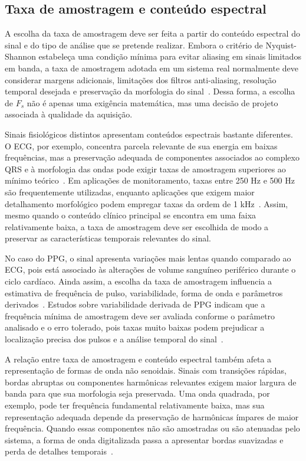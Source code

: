 \documentclass[a4paper,12pt]{fcte}
\begin{document}
\subsection{Taxa de amostragem e conteúdo espectral}

A escolha da taxa de amostragem deve ser feita a partir do conteúdo espectral do sinal e do tipo de análise que se pretende realizar. Embora o critério de Nyquist-Shannon estabeleça uma condição mínima para evitar aliasing em sinais limitados em banda, a taxa de amostragem adotada em um sistema real normalmente deve considerar margens adicionais, limitações dos filtros anti-aliasing, resolução temporal desejada e preservação da morfologia do sinal~\cite{kester2008mt002}. Dessa forma, a escolha de $F_s$ não é apenas uma exigência matemática, mas uma decisão de projeto associada à qualidade da aquisição.

Sinais fisiológicos distintos apresentam conteúdos espectrais bastante diferentes. O ECG, por exemplo, concentra parcela relevante de sua energia em baixas frequências, mas a preservação adequada de componentes associados ao complexo QRS e à morfologia das ondas pode exigir taxas de amostragem superiores ao mínimo teórico~\cite{chu2023ecgsystem,su2023ecg_acquisition}. Em aplicações de monitoramento, taxas entre 250 Hz e 500 Hz são frequentemente utilizadas, enquanto aplicações que exigem maior detalhamento morfológico podem empregar taxas da ordem de 1 kHz~\cite{raus2025ecg_testing}. Assim, mesmo quando o conteúdo clínico principal se encontra em uma faixa relativamente baixa, a taxa de amostragem deve ser escolhida de modo a preservar as características temporais relevantes do sinal.

No caso do PPG, o sinal apresenta variações mais lentas quando comparado ao ECG, pois está associado às alterações de volume sanguíneo periférico durante o ciclo cardíaco. Ainda assim, a escolha da taxa de amostragem influencia a estimativa de frequência de pulso, variabilidade, forma de onda e parâmetros derivados~\cite{charlton2022wearable_ppg}. Estudos sobre variabilidade derivada de PPG indicam que a frequência mínima de amostragem deve ser avaliada conforme o parâmetro analisado e o erro tolerado, pois taxas muito baixas podem prejudicar a localização precisa dos pulsos e a análise temporal do sinal~\cite{beres2021ppg_sampling}.

A relação entre taxa de amostragem e conteúdo espectral também afeta a representação de formas de onda não senoidais. Sinais com transições rápidas, bordas abruptas ou componentes harmônicas relevantes exigem maior largura de banda para que sua morfologia seja preservada. Uma onda quadrada, por exemplo, pode ter frequência fundamental relativamente baixa, mas sua representação adequada depende da preservação de harmônicas ímpares de maior frequência. Quando essas componentes não são amostradas ou são atenuadas pelo sistema, a forma de onda digitalizada passa a apresentar bordas suavizadas e perda de detalhes temporais~\cite{kester2008mt002}.
\end{document}
